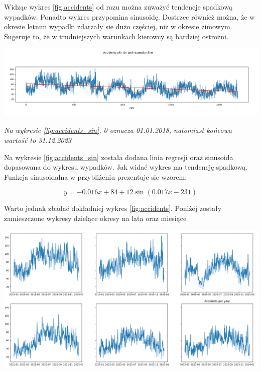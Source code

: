 \documentclass{article}
\begin{document}
Widząc wykres \ref{fig:accidents} od razu można zuważyć tendencje spadkową wypadków. Ponadto wykres przypomina sinusoidę. Dostrzec również można, że w okresie letnim wypadki zdarzały sie dużo częściej, niż w okresie zimowym. Sugeruje to, że w trudniejszych warunkach kierowcy są bardziej ostrożni.

\begin{center}
    \includegraphics[width=\textwidth]{visualization/accidents_sin.png}
    \captionsetup{hypcap=false}
    \label{fig:accidents_sin}
\end{center}

\textit{Na wykresie \ref{fig:accidents_sin}, 0 oznacza 01.01.2018, natomiast końcowa wartość to 31.12.2023}

Na wykresie \ref{fig:accidents_sin} została dodana linia regresji oraz sinusoida dopasowana do wykresu wypadków. Jak widać wykres ma tendencję spadkową. Funkcja sinusoidalna w przybliżeniu prezentuje sie wzorem:

\begin{equation} \label{eq:sin_equation}
    y = -0.016x + 84 + 12\sin(0.017x - 231) 
\end{equation}

Warto jednak zbadać dokładniej wykres \ref{fig:accidents}. Poniżej zostały zamieszczone wykresy dzielące okresy na lata oraz miesiące

\begin{center}
    \includegraphics[scale=0.3]{visualization/accidents_per_year.png}
    \captionsetup{hypcap=false}
    \label{fig:accidents_year}
\end{center}
\end{document}
